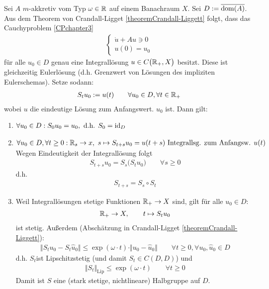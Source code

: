 \begin{beispiel}\enter
Sei $A$ $m$-akkretiv vom Typ $\omega\in\mathbb{R}$ auf einem Banachraum $X$. Sei $D:=\overline{\operatorname{dom}(A)}$. Aus dem Theorem von Crandall-Ligget \ref{theoremCrandall-Liggett} folgt, dass das Cauchyproblem \eqref{CPchapter3}
\begin{align*}
\left\lbrace\begin{array}{r}
\dot{u}+Au\ni 0\\
u(0)=u_0
\end{array}\right.
\end{align*}
für alle $u_0\in D$ genau eine Integrallösung $u\in C\big(\mathbb{R}_+,X\big)$ besitzt. Diese ist gleichzeitig Eulerlösung (d.h. Grenzwert von Lösungen des impliziten Eulerschemas). Setze sodann:
\begin{align*}
S_t u_0:=u(t)\qquad\forall u_0\in D,\forall t\in\mathbb{R}_+
\end{align*}
wobei $u$ die eindeutige Lösung zum Anfangswert. $u_0$ ist. Dann gilt:
\begin{enumerate}[label=(\roman*)]
\item $\begin{aligned}
\forall u_0\in D:S_0 u_0=u_0,\text{ d.h. }S_0=\operatorname{id}_D
\end{aligned}$
\item $\begin{aligned}
\forall u_0\in D,\forall t\geq 0:\mathbb{R}_s\to x,~
s\mapsto S_{t+s} u_0=u(t+s)\text{ Integrallsg. zum Anfangsw. }u(t)
\end{aligned}$\\
Wegen Eindeutigkeit der Integrallösung folgt
\begin{align*}
S_{t+s}u_0=S_s\big( S_t u_0\big)\qquad\forall s\geq0
\end{align*}
d.h.
\begin{align*}
S_{t+s}=S_s\circ S_t
\end{align*}
\item Weil Integrallösungen stetige Funktionen $\mathbb{R}_+\to X$ sind, gilt für alle $u_0\in D$:
\begin{align*}
\mathbb{R}_+\to X,\qquad t\mapsto S_t u_0
\end{align*}
ist stetig. Außerdem (Abschätzung in Crandall-Ligget \ref{theoremCrandall-Liggett}):
\begin{align*}
\big\Vert S_t u_0-S_t\hat{u}_0\big\Vert\leq\exp(\omega\cdot t)\cdot\Vert u_0-\hat{u}_0\big\Vert\qquad\forall t\geq0,\forall u_0,\hat{u}_0\in D
\end{align*}
d.h. $S_t$ist Lipschitzstetig (und damit $S_t\in C(D,D)$) und 
\begin{align*}
\big\Vert S_t\big\Vert_{\text{Lip}}\leq\exp(\omega\cdot t)\qquad\forall t\geq0
\end{align*}
Damit ist $S$ eine (stark stetige, nichtlineare) Halbgruppe auf $D$.
\end{enumerate}
\end{beispiel}

